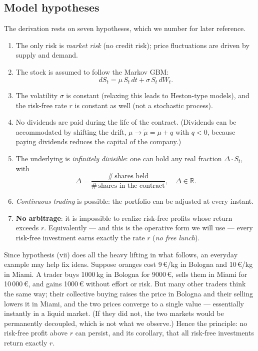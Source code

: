 \subsection{Model hypotheses}\label{sec:bs-hypotheses}

The derivation rests on seven hypotheses, which we number for later reference.
\begin{enumerate}[label=\roman*)]
    \item The only risk is \emph{market risk} (no credit risk); price fluctuations are driven by supply and demand.
    \item The stock is assumed to follow the Markov GBM:
    \begin{equation}
    dS_t = \mu\, S_t\, dt + \sigma\, S_t\, dW_t.
    \end{equation}
    \item The volatility $\sigma$ is constant (relaxing this leads to Heston-type models), and the risk-free rate $r$ is constant as well (not a stochastic process).
    \item No dividends are paid during the life of the contract.
    (Dividends can be accommodated by shifting the drift, $\mu \to \tilde\mu = \mu + q$ with $q < 0$, because paying dividends reduces the capital of the company.)
    \item The underlying is \emph{infinitely divisible}: one can hold any real fraction $\Delta \cdot S_t$, with
    \begin{equation}
    \Delta = \frac{\#\,\text{shares held}}{\#\,\text{shares in the contract}},\quad \Delta\in\mathbb R.
    \end{equation}
    \item \emph{Continuous trading} is possible: the portfolio can be adjusted at every instant.
    \item \textbf{No arbitrage}: it is impossible to realize risk-free profits whose return exceeds $r$.
    Equivalently --- and this is the operative form we will use --- every risk-free investment earns exactly the rate $r$ (\emph{no free lunch}).
\end{enumerate}

Since hypothesis (vii) does all the heavy lifting in what follows, an everyday example may help fix ideas.
Suppose oranges cost 9\,\euro/kg in Bologna and 10\,\euro/kg in Miami.
A trader buys 1000\,kg in Bologna for 9000\,\euro{}, sells them in Miami for 10\,000\,\euro{}, and gains 1000\,\euro{} without effort or risk.
But many other traders think the same way; their collective buying raises the price in Bologna and their selling lowers it in Miami, and the two prices converge to a single value --- essentially instantly in a liquid market.
(If they did not, the two markets would be permanently decoupled, which is not what we observe.)
Hence the principle: no risk-free profit above $r$ can persist, and its corollary, that all risk-free investments return exactly $r$.

